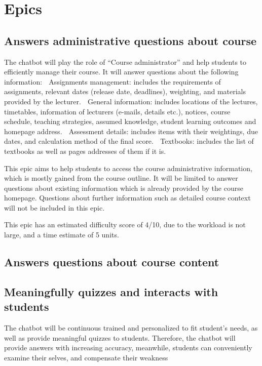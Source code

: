 \documentclass{article}
\begin{document}
\section{Epics}
\subsection{Answers administrative questions about course}
The chatbot will play the role of “Course administrator” and help students to efficiently manage their course. It will answer questions about the following information:
	Assignments management: includes the requirements of assignments, relevant dates (release date, deadlines), weighting, and materials provided by the lecturer.
	General information: includes locations of the lectures, timetables, information of lecturers (e-mails, details etc.), notices, course schedule, teaching strategies, assumed knowledge, student learning outcomes and homepage address.
	Assessment details: includes items with their weightings, due dates, and calculation method of the final score.
	Textbooks: includes the list of textbooks as well as pages addresses of them if it is.

This epic aims to help students to access the course administrative information, which is mostly gained from the course outline. It will be limited to answer questions about existing information which is already provided by the course homepage. Questions about further information such as detailed course context will not be included in this epic.

This epic has an estimated difficulty score of 4/10, due to the workload is not large, and a time estimate of 5 units.



\subsection{Answers questions about course content}


\subsection{Meaningfully quizzes and interacts with students}
The chatbot will be continuous trained and personalized to fit student’s needs, as well as provide meaningful quizzes to students. Therefore, the chatbot will provide answers with increasing accuracy, meanwhile, students can conveniently examine their selves, and compensate their weakness
\end{document}
